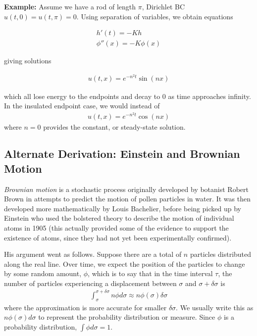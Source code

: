 \documentclass{article}
\begin{document}
	\vspace{0.25 cm}
	
	\textbf{Example:} Assume we have a rod of length $\pi$, Dirichlet BC $u(t,0) = u(t,\pi) = 0$. Using separation of variables, we obtain equations
	
	\begin{align*}
		h'(t) = -K h\\
		\phi''(x) = -K\phi(x) 
	\end{align*}
	
	giving solutions
	
	\begin{align*}
		u(t,x) = e^{-n^{2}t} \sin(nx)
	\end{align*}
	
	which all lose energy to the endpoints and decay to $0$ as time approaches infinity. In the insulated endpoint case, we would instead of 
	\begin{align*}
		u(t,x) = e^{-n^{2}t} \cos(nx)
	\end{align*}
	where $n=0$ provides the constant, or steady-state solution. 
	
	
	
	\subsection{Alternate Derivation: Einstein and Brownian Motion}
	
	\textit{Brownian motion} is a stochastic process originally developed by botanist Robert Brown in attempts to predict the motion of pollen particles in water. It was then developed more mathematically by Louis Bachelier, before being picked up by Einstein who used the bolstered theory to describe the motion of individual atoms in 1905 (this actually provided some of the evidence to support the existence of atoms, since they had not yet been experimentally confirmed). 
	
	His argument went as follows. Suppose there are a total of $n$ particles distributed along the real line. Over time, we expect the position of the particles to change by some random amount, $\phi$, which is to say that in the time interval $\tau$, the number of particles experiencing a displacement between $\sigma$ and $\sigma + \delta\sigma$ is 
	\begin{align*}
		\int_{\sigma}^{\sigma + \delta \sigma} n \phi d\sigma \approx n \phi(\sigma) \delta \sigma
	\end{align*}
	where the approximation is more accurate for smaller $\delta \sigma$. We usually write this as $n\phi(\sigma) d\sigma$ to represent the probability distribution or measure. Since $\phi$ is a probability distribution, $\int \phi d\sigma = 1$. 
	
\end{document}
